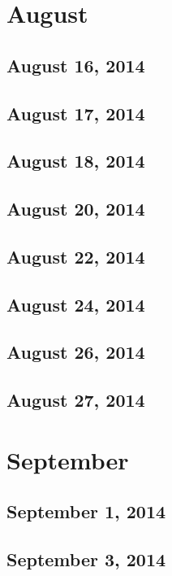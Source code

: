 \chapter{August}
\section{August 16, 2014}

\section{August 17, 2014}

\section{August 18, 2014}

\section{August 20, 2014}

\section{August 22, 2014}

\section{August 24, 2014}

\section{August 26, 2014}

\section{August 27, 2014}

\chapter{September}
\section{September 1, 2014}

\section{September 3, 2014}


